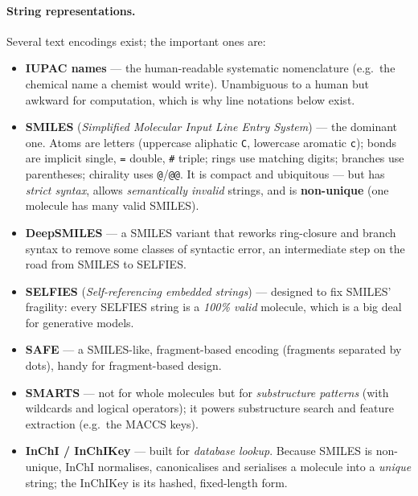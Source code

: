 \documentclass[11pt, oneside]{book}
\begin{document}
\newpage

\paragraph{String representations.} Several text encodings exist; the important
ones are:

\begin{itemize}
  \item \textbf{IUPAC names} --- the human-readable systematic nomenclature
        (e.g.\ the chemical name a chemist would write). Unambiguous to a human
        but awkward for computation, which is why line notations below exist.
  \item \textbf{SMILES} (\emph{Simplified Molecular Input Line Entry
        System}) --- the dominant one. Atoms are letters (uppercase
        aliphatic \texttt{C}, lowercase aromatic \texttt{c}); bonds are implicit
        single, \texttt{=} double, \texttt{\#} triple; rings use matching digits;
        branches use parentheses; chirality uses \texttt{@}/\texttt{@@}. It is
        compact and ubiquitous --- but has \emph{strict syntax}, allows
        \emph{semantically invalid} strings, and is \textbf{non-unique} (one
        molecule has many valid SMILES).
  \item \textbf{DeepSMILES} --- a SMILES variant that reworks ring-closure and
        branch syntax to remove some classes of syntactic error, an intermediate
        step on the road from SMILES to SELFIES.
  \item \textbf{SELFIES} (\emph{Self-referencing embedded strings}) --- designed
        to fix SMILES' fragility: every SELFIES string is a \emph{100\% valid}
        molecule, which is a big deal for generative models.
  \item \textbf{SAFE} --- a SMILES-like, fragment-based encoding (fragments
        separated by dots), handy for fragment-based design.
  \item \textbf{SMARTS} --- not for whole molecules but for \emph{substructure
        patterns} (with wildcards and logical operators); it powers substructure
        search and feature extraction (e.g.\ the MACCS keys).
  \item \textbf{InChI / InChIKey} --- built for \emph{database lookup}. Because
        SMILES is non-unique, InChI normalises, canonicalises and serialises a
        molecule into a \emph{unique} string; the InChIKey is its hashed,
        fixed-length form.
\end{itemize}
\end{document}
